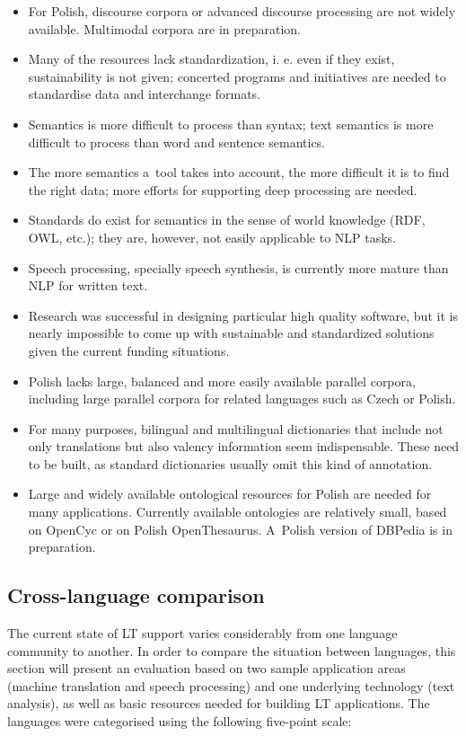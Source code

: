 \begin{multicols}{2}
\begin{itemize} \item For Polish, discourse corpora or advanced
discourse processing are not widely available. Multimodal corpora are
in preparation. \item Many of the resources lack standardization, i.
e. even if they exist, sustainability is not given; concerted programs
and initiatives are needed to standardise data and interchange
formats. \item Semantics is more difficult to process than syntax;
text semantics is more difficult to process than word and sentence
semantics. \item The more semantics a~tool takes into account, the
more difficult it is to find the right data; more efforts for
supporting deep processing are needed. \item Standards do exist for
semantics in the sense of world knowledge (RDF, OWL, etc.); they are,
however, not easily applicable to NLP tasks. \item Speech processing,
specially speech synthesis, is currently more mature than NLP for
written text. \item Research was successful in designing particular
high quality software, but it is nearly impossible to come up with
sustainable and standardized solutions given the current funding
situations. \item Polish lacks large, balanced and more easily
available parallel corpora, including large parallel corpora for
related languages such as Czech or Polish. \item For many purposes,
bilingual and multilingual dictionaries that include not only
translations but also valency information seem indispensable. These
need to be built, as standard dictionaries usually omit this kind of
annotation. \item Large and widely available ontological resources for
Polish are needed for many applications. Currently available
ontologies are relatively small, based on OpenCyc or on Polish
OpenThesaurus. A~Polish version of DBPedia is in preparation.
\end{itemize} 

\subsection{Cross-language comparison} The current state of LT support
varies considerably from one language community to another. In order
to compare the situation between languages, this section will present
an evaluation based on two sample application areas (machine
translation and speech processing) and one underlying technology (text
analysis), as well as basic resources needed for building LT
applications. The languages were categorised using the following
five-point scale: 


\end{multicols}
